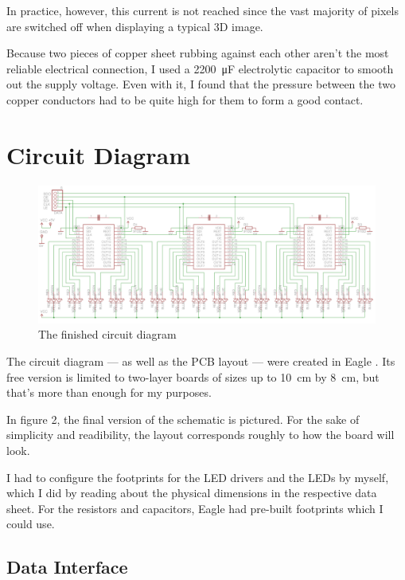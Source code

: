 \documentclass[a4paper, 11pt, titlepage]{report}
\begin{document}
In practice, however, this current is not reached since the vast majority of pixels are
switched off when displaying a typical 3D image.

Because two pieces of copper sheet rubbing against each other aren't the most reliable electrical
connection, I used a \SI{2200}{\micro\farad} electrolytic capacitor to smooth out the supply
voltage. Even with it, I found that the pressure between the two copper conductors had to be quite
high for them to form a good contact.


\section{Circuit Diagram}

\begin{figure}[h]
\vspace{0mm}
\includegraphics[width=\textwidth]{./images/schematic.png}
\vspace{-9mm}
\caption{The finished circuit diagram}
\vspace{4mm}
\end{figure}

The circuit diagram --- as well as the PCB layout --- were created in Eagle \cite{eagle}. Its free
version is limited to two-layer boards of sizes up to \SI{10}{\centi\meter} by
\SI{8}{\centi\meter}, but that's more than enough for my purposes.

In figure 2, the final version of the schematic is pictured. For the sake of simplicity and
readibility, the layout corresponds roughly to how the board will look.

I had to configure the footprints for the LED drivers and the LEDs by myself, which I did by
reading about the physical dimensions in the respective data sheet. For the resistors and
capacitors, Eagle had pre-built footprints which I could use.

\subsection{Data Interface}
\end{document}
